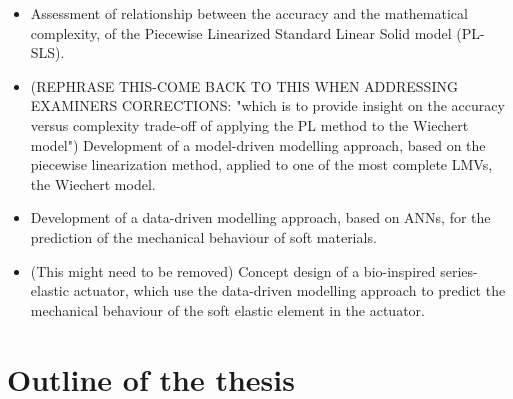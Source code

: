 \begin{itemize}
    \item Assessment of relationship between the accuracy and the mathematical complexity, of the Piecewise Linearized Standard Linear Solid model (PL-SLS).
    \item (REPHRASE THIS-COME BACK TO THIS WHEN ADDRESSING EXAMINERS CORRECTIONS: "which is to provide insight on the accuracy versus complexity trade-off of applying the PL method to the Wiechert model") Development of a model-driven modelling approach, based on the piecewise linearization method, applied to one of the most complete LMVs, the Wiechert model.
    \item Development of a data-driven modelling approach, based on ANNs, for the prediction of the mechanical behaviour of soft materials.
    \item (This might need to be removed) Concept design of a bio-inspired series-elastic actuator, which use the data-driven modelling approach to predict the mechanical behaviour of the soft elastic element in the actuator.
\end{itemize}

\section{Outline of the thesis}

